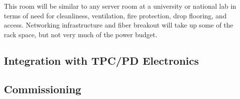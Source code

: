 This room will be similar to any server room at a university or national
lab in terms of need for cleanliness, ventilation, fire protection, drop
flooring, and access.  Networking infrastructure and fiber breakout will
take up some of the rack space, but not very much of the power budget.

\subsection{Integration with TPC/PD Electronics}
\label{sec:fdsp-daq-install-transport}


\subsection{Commissioning}
\label{sec:fdsp-daq-commissioning}


%


%
%
%
%
%

